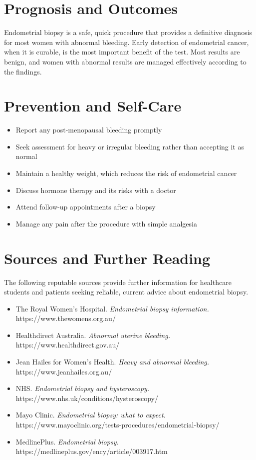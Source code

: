 \section*{Prognosis and Outcomes}
Endometrial biopsy is a safe, quick procedure that provides a definitive diagnosis for most women with abnormal bleeding. Early detection of endometrial cancer, when it is curable, is the most important benefit of the test. Most results are benign, and women with abnormal results are managed effectively according to the findings.

\section*{Prevention and Self-Care}
\begin{itemize}
    \item Report any post-menopausal bleeding promptly
    \item Seek assessment for heavy or irregular bleeding rather than accepting it as normal
    \item Maintain a healthy weight, which reduces the risk of endometrial cancer
    \item Discuss hormone therapy and its risks with a doctor
    \item Attend follow-up appointments after a biopsy
    \item Manage any pain after the procedure with simple analgesia
\end{itemize}

\section*{Sources and Further Reading}
The following reputable sources provide further information for healthcare students and patients seeking reliable, current advice about endometrial biopsy.
\begin{itemize}
    \item The Royal Women's Hospital. \textit{Endometrial biopsy information.} https://www.thewomens.org.au/
    \item Healthdirect Australia. \textit{Abnormal uterine bleeding.} https://www.healthdirect.gov.au/
    \item Jean Hailes for Women's Health. \textit{Heavy and abnormal bleeding.} https://www.jeanhailes.org.au/
    \item NHS. \textit{Endometrial biopsy and hysteroscopy.} https://www.nhs.uk/conditions/hysteroscopy/
    \item Mayo Clinic. \textit{Endometrial biopsy: what to expect.} https://www.mayoclinic.org/tests-procedures/endometrial-biopsy/
    \item MedlinePlus. \textit{Endometrial biopsy.} https://medlineplus.gov/ency/article/003917.htm
\end{itemize}
